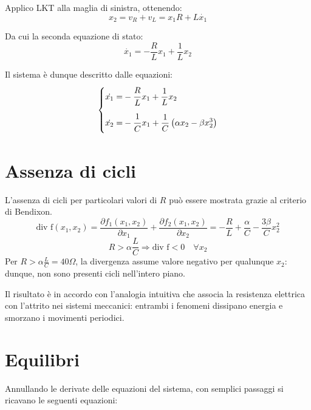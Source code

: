 \documentclass[11pt, a4paper]{article}
\begin{document}
Applico LKT alla maglia di sinistra, ottenendo:
\begin{equation}
x_2 = v_R + v_L = x_1 R + L \dot{x_1}
\end{equation}

Da cui la seconda equazione di stato:
\begin{equation}
    \dot{x_1} = -\frac{R}{L}x_1 + \frac{1}{L} x_2
\end{equation}

Il sistema è dunque descritto dalle equazioni:
\begin{equation}
    \left\{
    \begin{aligned}
        \dot{x_1} =& -\frac{\strut R}{\strut L}x_1 + \frac{1}{L} x_2\\
        \dot{x_2} =& -\frac{\strut 1}{\strut C} x_1 + \frac{1}{C}\left( \alpha x_2 - \beta x_2^3\right)\\
    \end{aligned}
    \right.
\end{equation}

\section{Assenza di cicli}
L'assenza di cicli per particolari valori di $R$ può essere mostrata grazie al criterio di Bendixon.
\begin{equation}
    \textrm{div f}(x_1, x_2) = \frac{\partial f_1(x_1,x_2)}{\partial x_1} + \frac{\partial f_2(x_1,x_2)}{\partial x_2} = -\frac{R}{L} + \frac{\alpha}{C} - \frac{3\beta}{C}x_2^2
\end{equation}
\begin{equation}\label{big-resistance}
    R > \alpha \frac{L}{C} \Longrightarrow \textrm{div f}<0 \quad \forall x_2
\end{equation}
Per $R > \alpha \frac{L}{C} = 40 \Omega$, la divergenza assume valore negativo per qualunque $x_2$: dunque, non sono presenti cicli nell'intero piano.

Il risultato è in accordo con l'analogia intuitiva che associa la resistenza elettrica con l'attrito nei sistemi meccanici: entrambi i fenomeni dissipano energia e smorzano i movimenti periodici.

\section{Equilibri}
Annullando le derivate delle equazioni del sistema, con semplici passaggi si ricavano le seguenti equazioni:
\end{document}
